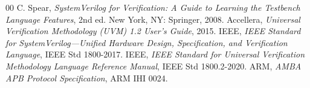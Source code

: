 \documentclass[conference]{IEEEtran}
\begin{document}
\begin{thebibliography}{00}
 C. Spear, \textit{SystemVerilog for Verification: A Guide to
Learning the Testbench Language Features}, 2nd ed. New York, NY: Springer, 2008.
 Accellera, \textit{Universal Verification Methodology (UVM) 1.2
User's Guide}, 2015.
 IEEE, \textit{IEEE Standard for SystemVerilog—Unified
Hardware Design, Specification, and Verification Language}, IEEE Std 1800-2017.
 IEEE, \textit{IEEE Standard for Universal Verification
Methodology Language Reference Manual}, IEEE Std 1800.2-2020.
 ARM, \textit{AMBA APB Protocol Specification}, ARM IHI 0024.
\end{thebibliography}
\end{document}
